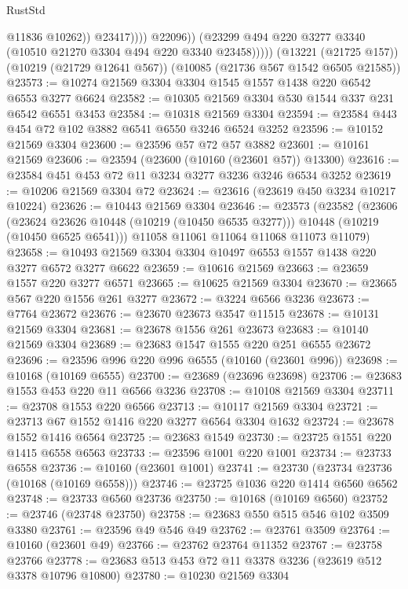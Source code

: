 \begin{lexlean}{RustStd}
\begin{coremodule}
                          @11836
                          @10262))
                      @23417))))
              @22096))
          (@23299 @494 @220 @3277 @3340 (@10510 @21270 @3304 @494 @220 @3340 @23458)))))
    (@13221 (@21725 @157))
    (@10219 (@21729 @12641 @567))
    (@10085 (@21736 @567 @1542 @6505 @21585))
@23573 := @10274 @21569 @3304 @3304 @1545 @1557 @1438 @220 @6542 @6553 @3277 @6624
@23582 := @10305 @21569 @3304 @530 @1544 @337 @231 @6542 @6551 @3453
@23584 := @10318 @21569 @3304
@23594 := @23584 @443 @454 @72 @102 @3882 @6541 @6550 @3246 @6524 @3252
@23596 := @10152 @21569 @3304
@23600 := @23596 @57 @72 @57 @3882
@23601 := @10161 @21569
@23606 := @23594 (@23600 (@10160 (@23601 @57)) @13300)
@23616 := @23584 @451 @453 @72 @11 @3234 @3277 @3236 @3246 @6534 @3252
@23619 := @10206 @21569 @3304 @72
@23624 := @23616 (@23619 @450 @3234 @10217 @10224)
@23626 := @10443 @21569 @3304
@23646 := @23573
    (@23582
      (@23606
        (@23624 @23626 @10448 (@10219 (@10450 @6535 @3277)))
        @10448
        (@10219 (@10450 @6525 @6541)))
      @11058
      @11061
      @11064
      @11068
      @11073
      @11079)
@23658 := @10493 @21569 @3304 @3304 @10497 @6553 @1557 @1438 @220 @3277 @6572 @3277 @6622
@23659 := @10616 @21569
@23663 := @23659 @1557 @220 @3277 @6571
@23665 := @10625 @21569 @3304
@23670 := @23665 @567 @220 @1556 @261 @3277
@23672 := @3224 @6566 @3236
@23673 := @7764 @23672
@23676 := @23670 @23673 @3547 @11515
@23678 := @10131 @21569 @3304
@23681 := @23678 @1556 @261 @23673
@23683 := @10140 @21569 @3304
@23689 := @23683 @1547 @1555 @220 @251 @6555 @23672
@23696 := @23596 @996 @220 @996 @6555 (@10160 (@23601 @996))
@23698 := @10168 (@10169 @6555)
@23700 := @23689 (@23696 @23698)
@23706 := @23683 @1553 @453 @220 @11 @6566 @3236
@23708 := @10108 @21569 @3304
@23711 := @23708 @1553 @220 @6566
@23713 := @10117 @21569 @3304
@23721 := @23713 @67 @1552 @1416 @220 @3277 @6564 @3304 @1632
@23724 := @23678 @1552 @1416 @6564
@23725 := @23683 @1549
@23730 := @23725 @1551 @220 @1415 @6558 @6563
@23733 := @23596 @1001 @220 @1001
@23734 := @23733 @6558
@23736 := @10160 (@23601 @1001)
@23741 := @23730 (@23734 @23736 (@10168 (@10169 @6558)))
@23746 := @23725 @1036 @220 @1414 @6560 @6562
@23748 := @23733 @6560 @23736
@23750 := @10168 (@10169 @6560)
@23752 := @23746 (@23748 @23750)
@23758 := @23683 @550 @515 @546 @102 @3509 @3380
@23761 := @23596 @49 @546 @49
@23762 := @23761 @3509
@23764 := @10160 (@23601 @49)
@23766 := @23762 @23764 @11352
@23767 := @23758 @23766
@23778 := @23683 @513 @453 @72 @11 @3378 @3236 (@23619 @512 @3378 @10796 @10800)
@23780 := @10230 @21569 @3304

\end{coremodule}
\end{lexlean}
